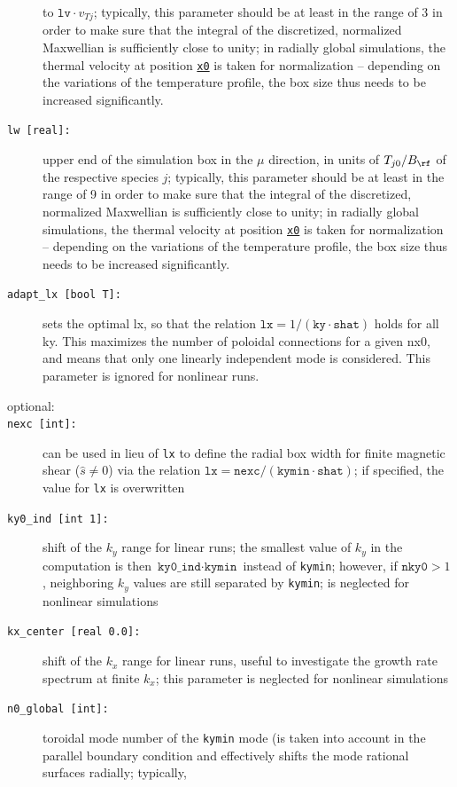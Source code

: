 \documentclass[12pt]{article}
\begin{document}
\begin{description}
to $\mathtt{lv} \cdot v_{Tj}$; typically, this parameter should be at least in the range of 3 in
order to make sure that the integral of the discretized, normalized Maxwellian is sufficiently close to unity;
in radially global simulations, the thermal velocity at position \hyperlink{x0}{\tt x0} is taken for normalization --
depending on the variations of the temperature profile, the box size thus needs to be increased significantly.
\item[\texttt{lw [real]:}] upper end of the simulation box in the $\mu$ direction, in units of
$T_{j0}/B_\rf$ of the respective species $j$; typically, this parameter should be at least
in the range of 9 in order to make sure that the integral of the discretized, normalized Maxwellian is
sufficiently close to unity;
in radially global simulations, the thermal velocity at position \hyperlink{x0}{\tt x0} is taken for normalization --
depending on the variations of the temperature profile, the box size thus needs to be increased significantly.
\item[\texttt{adapt\_lx [bool T]:}] sets the optimal lx, so that the relation
  $\texttt{lx}=1/(\texttt{ky}\cdot\texttt{shat})$ holds for all ky. This maximizes the number of poloidal
  connections for a given nx0, and means that only one linearly independent mode is considered. This parameter
  is ignored for nonlinear runs.
\item[optional:]
\item[\hypertarget{nexc}{\texttt{nexc [int]:}}] can be used in lieu of \texttt{lx} to define the radial box width for finite
magnetic shear ($\hat s\ne 0$) via the relation $\texttt{lx}=\texttt{nexc}/(\texttt{kymin}\cdot\texttt{shat})$;
if specified, the value for \texttt{lx} is overwritten
\item[\texttt{ky0\_ind [int 1]:}] shift of the $k_y$ range for linear runs; the smallest value of $k_y$ in the computation
is then $\texttt{ky0\_ind}\cdot\texttt{kymin}$ instead of \texttt{kymin}; however, if $\texttt{nky0}>1$, neighboring
$k_y$ values are still separated by \texttt{kymin}; is neglected for nonlinear simulations
\item[\texttt{kx\_center [real 0.0]:}] shift of the $k_x$ range for linear runs, useful to investigate the
growth rate spectrum at finite $k_x$; this parameter is neglected for nonlinear simulations
\item[\hypertarget{n0_global}{\texttt{n0\_global [int]:}}] toroidal mode number of the \texttt{kymin} mode (is taken
  into account in the parallel boundary condition and effectively shifts the mode rational surfaces radially; typically,

\end{description}
\end{document}
